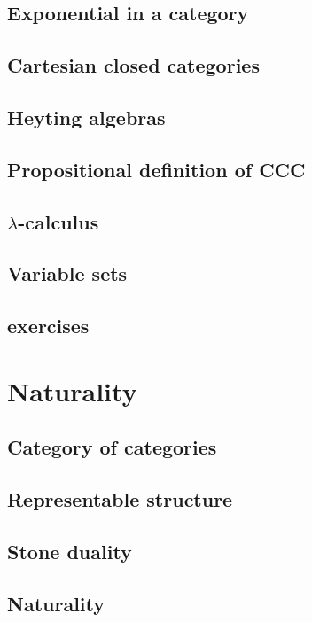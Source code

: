 \documentclass[uplatex, 12pt, dvipdfmx]{jsarticle}
\begin{document}
\subsection{Exponential in a category}

\subsection{Cartesian closed categories}

\subsection{Heyting algebras}

\subsection{Propositional definition of CCC}

\subsection{$\lambda$-calculus}

\subsection{Variable sets}

\subsection{exercises}

\section{Naturality}

\subsection{Category of categories}

\subsection{Representable structure}

\subsection{Stone duality}

\subsection{Naturality}
\end{document}
